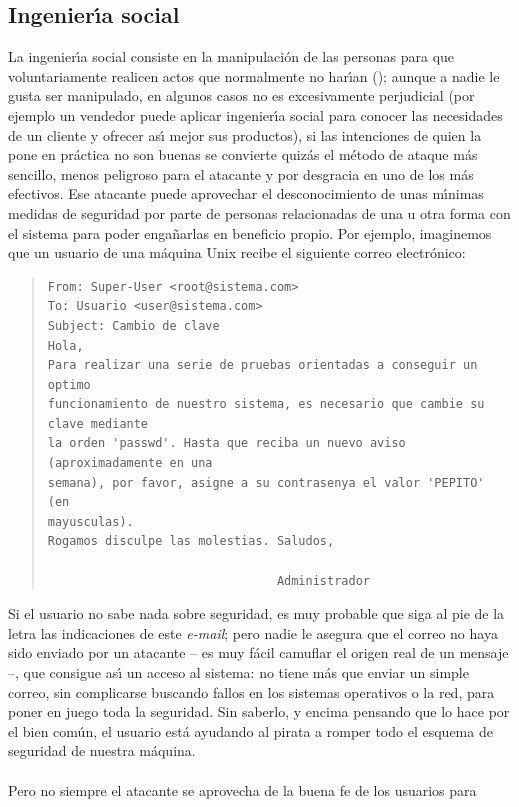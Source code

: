 \subsection{Ingenier\'{\i}a social}
La ingenier\'{\i}a social consiste en la manipulaci\'on de las personas para
que voluntariamente realicen actos que normalmente no har\'{\i}an 
(\cite{kn:fen99}); aunque a nadie le gusta ser manipulado, en algunos casos no 
es excesivamente perjudicial (por ejemplo un vendedor puede aplicar 
ingenier\'{\i}a social para conocer las necesidades de un cliente y ofrecer 
as\'{\i} mejor sus productos), si las intenciones de quien la pone en 
pr\'actica no son buenas se convierte quiz\'as el m\'etodo de ataque m\'as 
sencillo, menos peligroso para el atacante y por desgracia en uno de los m\'as 
efectivos. Ese atacante puede aprovechar el desconocimiento de unas m\'{\i}nimas
medidas de seguridad por parte de personas relacionadas de una u otra forma
con el sistema para poder enga\~narlas en beneficio propio. Por ejemplo,
imaginemos que un usuario de una m\'aquina Unix recibe el siguiente correo
electr\'onico:
\begin{quote}
\begin{verbatim}
From: Super-User <root@sistema.com>
To: Usuario <user@sistema.com>
Subject: Cambio de clave
Hola,
Para realizar una serie de pruebas orientadas a conseguir un optimo 
funcionamiento de nuestro sistema, es necesario que cambie su clave mediante
la orden 'passwd'. Hasta que reciba un nuevo aviso (aproximadamente en una
semana), por favor, asigne a su contrasenya el valor 'PEPITO' (en 
mayusculas).
Rogamos disculpe las molestias. Saludos,
                        
                                Administrador
\end{verbatim}
\end{quote}
Si el usuario no sabe nada sobre seguridad, es muy probable que siga al pie de
la letra las indicaciones de este {\it e-mail}; pero nadie le asegura que el
correo no haya sido enviado por un atacante -- es muy f\'acil camuflar el 
origen real de un mensaje --, que consigue as\'{\i} un acceso al sistema: no
tiene m\'as que enviar un simple correo, sin complicarse buscando fallos en
los sistemas operativos o la red, para poner en juego toda la seguridad. Sin 
saberlo, y encima pensando que lo hace por el bien com\'un, el usuario est\'a 
ayudando al pirata a romper todo el esquema de seguridad de nuestra m\'aquina.\\
\\Pero no siempre el atacante se aprovecha de la buena fe de los usuarios para
